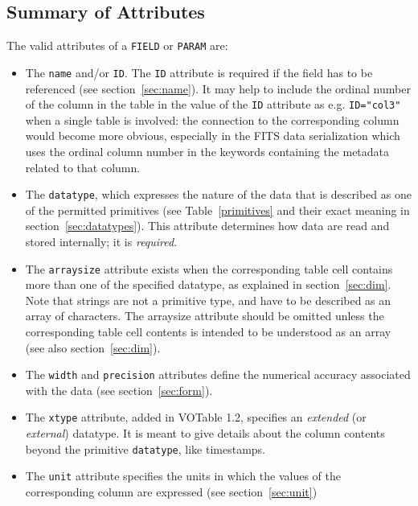 \documentclass[11pt,a4paper]{ivoa}
\def\Aref#1{section~\ref{#1}}
\def\Tref#1{Table~\ref{#1}}
\let\fg=\color
\def\attr#1{{\tt{\fg{DarkRed}#1}}}
\def\elem#1{{\tt{\fg{DarkRed}#1}}}
\def\attrval#1#2{{\tt{\fg{DarkRed}#1}="{\fg{DarkPurple}#2}"}}
\begin{document}
\subsection{Summary of Attributes}
\label{elem:FIELD}
\label{elem:PARAM}
The valid attributes of a \elem{FIELD} or \elem{PARAM} are:

\begin{itemize}
\item   The \attr{name} and/or \attr{ID}. The \attr{ID} attribute is required
        if the field has to be referenced (see
        \Aref{sec:name}).
        It may help to include the ordinal number of
        the column in the table in the value of the \attr{ID} attribute
        as e.g. \attrval{ID}{col3} when a single table is involved:
        the connection to the
        corresponding column would become
        more obvious, especially in the FITS data serialization
        which uses the ordinal column number in the keywords containing
        the metadata related to that column.

\item   The \attr{datatype}, which expresses the nature of the data
        that is described as one of the permitted primitives
        (see \Tref{primitives} and their exact meaning
        in \Aref{sec:datatypes}).
        This attribute determines
        how data are read and stored internally;
        it is {\em required}.

\item   The \attr{arraysize} attribute exists when
        the corresponding table cell contains more than one of the specified
        datatype, as explained in \Aref{sec:dim}.
        Note that strings are not a primitive type,
        and have to be described as an array of characters.  The
        arraysize attribute should be omitted unless the corresponding
        table cell contents is intended to be understood as an array
        (see also \Aref{sec:dim}).

\item   {\fg{black}}The \attr{width} and \attr{precision} attributes define the
        numerical accuracy associated with the data
        (see \Aref{sec:form}).

\item	The \attr{xtype} attribute, added in VOTable 1.2, specifies an
	{\em extended} (or {\em external}) datatype. It is meant
	to give details about the column contents beyond the
	primitive \attr{datatype}, like timestamps.

\item   The \attr{unit} attribute specifies the units in which
        the values of the corresponding column are expressed
        (see \Aref{sec:unit})


\end{itemize}
\end{document}
